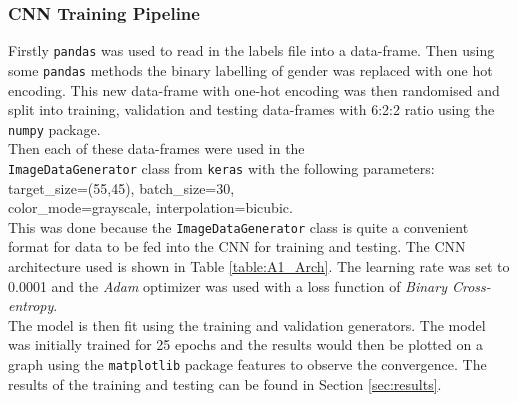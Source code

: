 \documentclass{article}
\begin{document}
 	\subsubsection{CNN Training Pipeline}
 	Firstly \verb|pandas| was used to read in the labels file into a data-frame. Then using some \verb|pandas| methods the binary labelling of gender was replaced with one hot encoding. This new data-frame with one-hot encoding was then randomised and split into training, validation and testing data-frames with 6:2:2 ratio using the \verb|numpy| package.\\
 	
 	Then each of these data-frames were used in the \\ \verb|ImageDataGenerator| class from \verb|keras| with the following parameters: target\_size=(55,45), batch\_size=30,\\ color\_mode=grayscale, interpolation=bicubic.\\
 	
 	This was done because the \verb|ImageDataGenerator| class is quite a convenient format for data to be fed into the CNN for training and testing. The CNN architecture used is shown in Table \ref{table:A1_Arch}. The learning rate was set to 0.0001 and the \textit{Adam} optimizer was used with a loss function of \textit{Binary Cross-entropy}.\\
 	
 	 The model is then fit using the training and validation generators. The model was initially trained for 25 epochs and the results would then be plotted on a graph using the \verb|matplotlib| package features to observe the convergence. The results of the training and testing can be found in Section \ref{sec:results}.
 	
\end{document}
